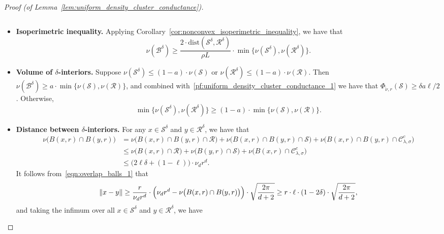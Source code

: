 \documentclass{article}
\newcommand{\1}{\mathbf{1}}
\newcommand{\mc}[1]{\mathcal{#1}}
\newcommand{\wt}[1]{\widetilde{#1}}
\theoremstyle{definition}
\theoremstyle{remark}
\begin{document}
\begin{proof}[Proof (of Lemma~\ref{lem:uniform_density_cluster_conductance})]
\begin{itemize}
\begin{equation}
		\end{equation}
		\item \textbf{Isoperimetric inequality.}
		Applying Corollary~\ref{cor:nonconvex_isoperimetric_inequality}, we have that
		\begin{equation}
		\label{pf:uniform_density_cluster_conductance_2}
		\nu(\mc{B}^{\delta}) \geq \frac{2 \cdot \mathrm{dist}(\mc{S}^{\delta},\mc{R}^{\delta})}{\rho L} \cdot \min\bigl\{\nu(\mc{S}^{\delta}),\nu(\mc{R}^{\delta})\bigr\}.
		\end{equation}
		\item \textbf{Volume of $\delta$-interiors.} Suppose $\nu(\mc{S}^{\delta}) \leq (1 - a) \cdot \nu(\mc{S})$ or $\nu(\mc{R}^{\delta}) \leq (1 - a) \cdot \nu(\mc{R})$. Then 
		$\nu(\mc{B}^{\delta}) \geq a \cdot \min\{\nu(\mc{S}), \nu(\mc{R})\}$, and combined with~\eqref{pf:uniform_density_cluster_conductance_1} we have that $\Phi_{\wt{\nu},r}(\mc{S}) \geq \delta a \ell/2$. Otherwise,
		\begin{equation}
		\label{pf:uniform_density_cluster_conductance_3}
		\min\bigl\{\nu(\mc{S}^{\delta}),\nu(\mc{R}^{\delta})\bigr\} \geq (1- a) \cdot \min\bigl\{\nu(\mc{S}),\nu(\mc{R})\bigr\}.
		\end{equation}
		\item \textbf{Distance between $\delta$-interiors.} For any $x \in \mc{S}^{\delta}$ and $y \in \mc{R}^{\delta}$, we have that 
		\begin{align*}
		\nu\bigl(B(x,r) \cap B(y,r)\bigr) & = \nu\bigl(B(x,r) \cap B(y,r) \cap \mc{R}\bigr) + \nu\bigl(B(x,r) \cap B(y,r) \cap \mc{S}\bigr) + \nu\bigl(B(x,r) \cap B(y,r) \cap \mc{C}_{\lambda,\sigma}^c\bigr) \\
		& \leq \nu\bigl(B(x,r) \cap \mc{R}\bigr) + \nu\bigl(B(y,r) \cap \mc{S}\bigr) + \nu\bigl(B(x,r) \cap \mc{C}_{\lambda,\sigma}^c\bigr) \\
		& \leq \bigl(2\ell\delta + (1 - \ell)\bigr) \cdot \nu_dr^d.
		\end{align*}
		It follows from~\eqref{eqn:overlap_balls_1} that
		\begin{equation*}
		\|x - y\| \geq \frac{r}{\nu_d r^d} \cdot \Bigl(\nu_d r^d - \nu\bigl(B(x,r) \cap B(y,r)\bigr)\Bigr) \cdot \sqrt{\frac{2\pi}{d + 2}} \geq r \cdot \ell \cdot (1 - 2\delta) \cdot \sqrt{\frac{2\pi}{d + 2}},
		\end{equation*}
		and taking the infimum over all $x \in \mc{S}^{\delta}$ and $y \in \mc{R}^{\delta}$, we have
		\begin{equation}
		\label{pf:uniform_density_cluster_conductance_4}

\end{equation}
\end{itemize}
\end{proof}
\end{document}
